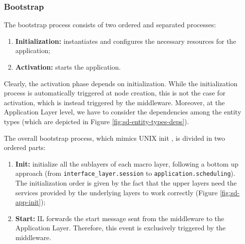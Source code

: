 \subsubsection{Bootstrap}

The bootstrap process consists of two ordered and separated processes:

\begin{enumerate}
  \item \textbf{Initialization:} instantiates and configures the necessary
    resources for the application;
  \item \textbf{Activation:} starts the application.
\end{enumerate}

Clearly, the activation phase depends on initialization.
While the initialization process is automatically triggered at node creation,
this is not the case for activation, which is instead triggered by the
middleware.
Moreover, at the Application Layer level, we have to consider the dependencies
among the entity types (which are depicted in Figure
\ref{fig:sd-entity-types-deps}).

The overall bootstrap process, which mimics UNIX init \cite{online-tlsag},
is divided in two ordered parts:
\begin{enumerate}
  \item \textbf{Init:} initialize all the sublayers of each macro layer,
  following a bottom up approach (from \verb|interface_layer.session| to
  \verb|application.scheduling|).
  The initialization order is given by the fact that the upper
  layers need the services provided by the underlying layers to work
  correctly (Figure \ref{fig:sd-app-init});
  \item \textbf{Start:} IL forwards the start message sent from the
  middleware to the Application Layer.
  Therefore, this event is exclusively triggered by the middleware.
\end{enumerate}

